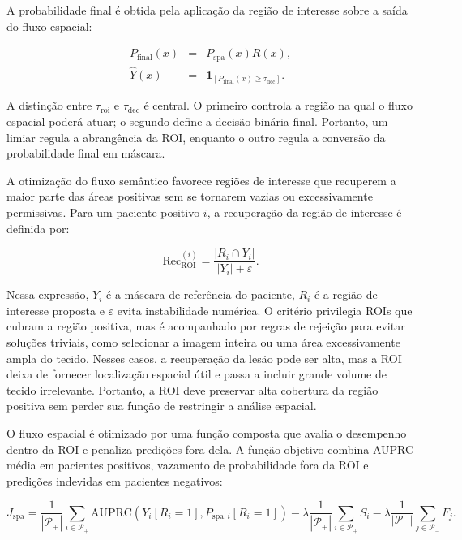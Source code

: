 A probabilidade final é obtida pela aplicação da região de interesse sobre a
saída do fluxo espacial:

\begin{equation}
\begin{array}{rcl}
P_{\mathrm{final}}(x) &=& P_{\mathrm{spa}}(x)R(x),\\[0.5em]
\hat{Y}(x) &=& \mathbf{1}_{[P_{\mathrm{final}}(x)\ge\tau_{\mathrm{dec}}]}.
\end{array}
\label{eq:final_gated_prediction}
\end{equation}

A distinção entre $\tau_{\mathrm{roi}}$ e $\tau_{\mathrm{dec}}$ é central. O
primeiro controla a região na qual o fluxo espacial poderá atuar; o segundo
define a decisão binária final. Portanto, um limiar regula a abrangência da ROI,
enquanto o outro regula a conversão da probabilidade final em máscara.

A otimização do fluxo semântico favorece regiões de interesse que recuperem a
maior parte das áreas positivas sem se tornarem vazias ou excessivamente
permissivas. Para um paciente positivo $i$, a recuperação da região de interesse
é definida por:

\begin{equation}
    \mathrm{Rec}_{\mathrm{ROI}}^{(i)} =
    \frac{|R_i \cap Y_i|}{|Y_i|+\varepsilon}.
    \label{eq:roi_recall}
\end{equation}

Nessa expressão, $Y_i$ é a máscara de referência do paciente, $R_i$ é a região
de interesse proposta e $\varepsilon$ evita instabilidade numérica. O critério
privilegia ROIs que cubram a região positiva, mas é acompanhado por regras de
rejeição para evitar soluções triviais, como selecionar a imagem inteira ou uma
área excessivamente ampla do tecido. Nesses casos, a recuperação da lesão pode
ser alta, mas a ROI deixa de fornecer localização espacial útil e passa a
incluir grande volume de tecido irrelevante. Portanto, a ROI deve preservar alta
cobertura da região positiva sem perder sua função de restringir a análise
espacial.

O fluxo espacial é otimizado por uma função composta que avalia o desempenho
dentro da ROI e penaliza predições fora dela. A função objetivo combina AUPRC
média em pacientes positivos, vazamento de probabilidade fora da ROI e predições
indevidas em pacientes negativos:

\begin{equation}
    J_{\mathrm{spa}} =
    \frac{1}{|\mathcal{P}_+|}
    \sum_{i\in\mathcal{P}_+}
    \mathrm{AUPRC}\left(Y_i[R_i=1], P_{\mathrm{spa},i}[R_i=1]\right)
    -
    \lambda\frac{1}{|\mathcal{P}_+|}\sum_{i\in\mathcal{P}_+}S_i
    -
    \lambda\frac{1}{|\mathcal{P}_-|}\sum_{j\in\mathcal{P}_-}F_j .
    \label{eq:spatial_objective}
\end{equation}

